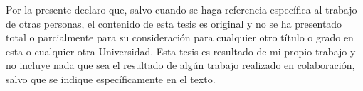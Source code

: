 
\begin{declaration}

Por la presente declaro que, salvo cuando se haga referencia específica al trabajo de otras personas, el contenido de esta tesis es original y no se ha presentado total o parcialmente para su consideración para cualquier otro título o grado en esta o cualquier otra Universidad. Esta tesis es resultado de mi propio trabajo y no incluye nada que sea el resultado de algún trabajo realizado en colaboración, salvo que se indique específicamente en el texto. 
\end{declaration}

